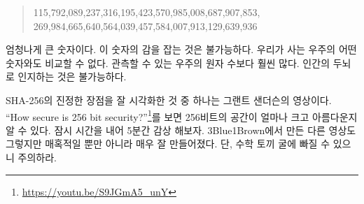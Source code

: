\begin{comment}
	\begin{quotation}\begin{samepage}
			115 quattuorvigintillion 792 trevigintillion 89 duovigintillion 237
			unvigintillion 316 vigintillion 195 novemdecillion 423 octodecillion 570
			septendecillion 985 sexdecillion 8 quindecillion 687 quattuordecillion 907
			tredecillion 853 duodecillion 269 undecillion 984 decillion 665 nonillion
			640 octillion 564 septillion 39 sextillion 457 quintillion 584 quadrillion 7
			trillion 913 billion 129 million 639 thousand 936.
	\end{samepage}\end{quotation}
\end{comment}
\begin{quotation}
	\begin{samepage}
		115,792,089,237,316,195,423,570,985,008,687,907,853,
		269,984,665,640,564,039,457,584,007,913,129,639,936
	\end{samepage}
\end{quotation}

\begin{comment}
	That's a lot of nonillions! Wrapping your head around this number is
	pretty much impossible. There is nothing in the physical universe to
	compare it to. It is far larger than the number of atoms in the
	observable universe. The human brain simply isn't made to make sense of
	it.
\end{comment}
엄청나게 큰 숫자이다. 이 숫자의 감을 잡는 것은 불가능하다. 
우리가 사는 우주의 어떤 숫자와도 비교할 수 없다.
관측할 수 있는 우주의 원자 수보다 훨씬 많다. 
인간의 두뇌로 인지하는 것은 불가능하다.

\newpage

\begin{comment}
	One of the best visualizations of the true strength of SHA-256 is a video by
	Grant Sanderson. Aptly named \textit{\enquote{How secure is 256 bit
			security?}}\footnote{Watch the video at \url{https://youtu.be/S9JGmA5_unY}} it
	beautifully shows how large a 256-bit space is. Do yourself a favor and take the
	five minutes to watch it. As all other \textit{3Blue1Brown} videos it is not
	only fascinating but also exceptionally well made. Warning: You might fall down
	a math rabbit hole.
\end{comment}
SHA-256의 진정한 장점을 잘 시각화한 것 중 하나는 그랜트 샌더슨의 영상이다.
\enquote{How secure is 256 bit
	security?}\footnote{\url{https://youtu.be/S9JGmA5_unY}}를 보면
256비트의 공간이 얼마나 크고 아름다운지 알 수 있다. 잠시 시간을 내어 5분간 감상 해보자.
3Blue1Brown에서 만든 다른 영상도 그렇지만 매혹적일 뿐만 아니라 매우 잘 만들어졌다.
단, 수학 토끼 굴에 빠질 수 있으니 주의하라.

